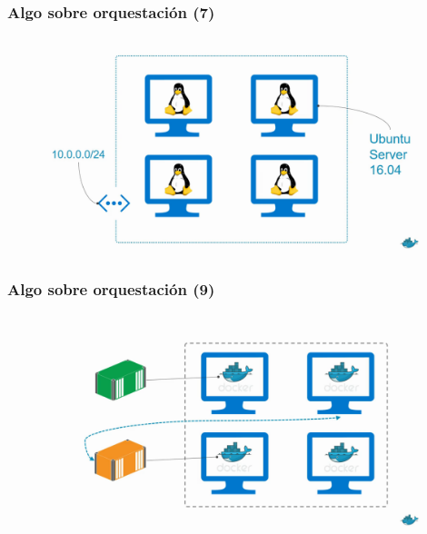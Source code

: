 \documentclass{beamer}
\begin{document}
\begin{frame}
  \frametitle{Algo sobre orquestación (7)}
	\begin{figure}[htp]
	\centering
	\includegraphics[width=0.95\linewidth]{img/orquestacion_7.png}
	\end{figure}
\end{frame}

\begin{frame}
  \frametitle{Algo sobre orquestación (9)}
	\begin{figure}[htp]
	\centering
	\includegraphics[width=0.95\linewidth]{img/orquestacion_9.png}
	\end{figure}
\end{frame}
\end{document}
